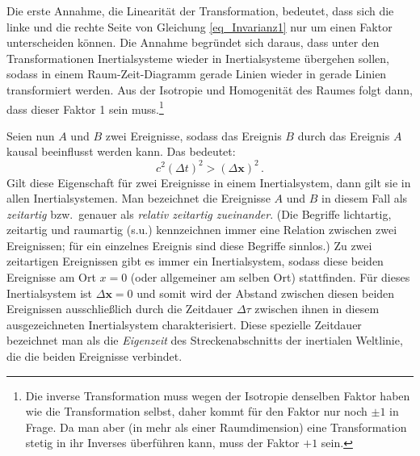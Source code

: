 Die erste Annahme, die Linearit\"at der Transformation, bedeutet, dass sich die linke und die rechte
Seite von Gleichung \ref{eq_Invarianz1} nur um einen Faktor unterscheiden k\"onnen. Die Annahme
begr\"undet sich daraus, dass unter den Transformationen Inertialsysteme wieder in Inertialsysteme
\"ubergehen sollen, sodass in einem Raum-Zeit-Diagramm gerade Linien wieder in gerade
Linien transformiert werden. Aus der Isotropie und Homogenit\"at des Raumes folgt dann, dass dieser
Faktor 1 sein muss.\footnote{Die inverse Transformation muss wegen der Isotropie denselben
Faktor haben wie die Transformation selbst, daher kommt f\"ur den Faktor nur noch $\pm 1$ in Frage.
Da man aber (in mehr als einer Raumdimension) eine Transformation stetig in ihr Inverses
\"uberf\"uhren kann, muss der Faktor $+1$ sein.} 

Seien nun $A$ und $B$ zwei Ereignisse, sodass
das Ereignis $B$ durch das Ereignis $A$ kausal beeinflusst werden kann. Das bedeutet:
\begin{equation} 
\label{eq_kausal}
              c^2 (\Delta t)^2 > (\Delta \pmb{x})^2     \, .
\end{equation}
Gilt diese Eigenschaft f\"ur zwei Ereignisse in einem Inertialsystem, dann gilt sie in allen
Inertialsystemen. Man bezeichnet die Ereignisse $A$ und $B$ in diesem Fall als 
\textit{zeitartig} bzw.\ genauer als \textit{relativ zeitartig zueinander}.
(Die Begriffe lichtartig, zeitartig und raumartig (s.u.) kennzeichnen immer eine Relation
zwischen zwei Ereignissen; f\"ur ein einzelnes Ereignis sind diese Begriffe sinnlos.)
Zu zwei zeitartigen Ereignissen gibt es immer ein Inertialsystem, sodass diese beiden 
Ereignisse am Ort $x=0$ (oder allgemeiner am selben Ort) stattfinden. F\"ur dieses Inertialsystem
ist $\Delta \pmb{x} =0$ und somit wird der Abstand zwischen diesen beiden Ereignissen 
ausschlie\ss lich durch die Zeitdauer $\Delta \tau$ zwischen ihnen in diesem ausgezeichneten
Inertialsystem charakterisiert. Diese spezielle Zeitdauer bezeichnet man als die 
\textit{Eigenzeit}
des Streckenabschnitts der inertialen Weltlinie, die die beiden Ereignisse verbindet.

